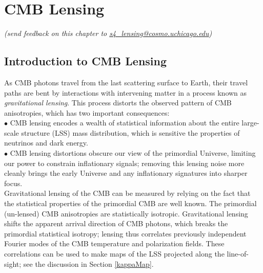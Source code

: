  
\chapter{CMB Lensing}

\begin{center}
{\small \it (send feedback on this chapter to \href{mailto:s4_lensing@cosmo.uchicago.edu}{s4\_lensing@cosmo.uchicago.edu})}
\end{center}



\def\nnu{N_{\mathrm eff}}
\def\gtrsim{\raise-.75ex\hbox{$\buildrel>\over\sim$}}
\section{Introduction to CMB Lensing}
\label{sec:lensing_intro}

As CMB photons travel from the last scattering surface to Earth, their travel paths are bent by interactions with intervening matter in a process known as \textit{gravitational lensing}.
This process distorts the observed pattern of CMB anisotropies, which has two important consequences:\\
 
$\bullet$ CMB lensing encodes a wealth of statistical information about the entire large-scale structure (LSS) mass distribution, which is sensitive the properties of neutrinos and dark energy.\\

$\bullet$ CMB lensing distortions obscure our view of the primordial Universe, limiting our power to constrain inflationary signals; removing this lensing noise more cleanly brings the early Universe and any inflationary signatures into sharper focus.\\


Gravitational lensing of the CMB can be measured by relying on the fact that the statistical properties of the primordial CMB are well known.
The primordial (un-lensed) CMB anisotropies are statistically isotropic.
Gravitational lensing shifts the apparent arrival direction of CMB photons, which breaks the primordial statistical isotropy;
lensing thus correlates previously independent Fourier modes of the CMB temperature and polarization fields.
These correlations can be used to make maps of the LSS projected along the line-of-sight; see the discussion in Section \ref{kappaMap}.

